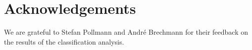 \section*{Acknowledgements}

We are grateful to Stefan Pollmann and Andr\'e Brechmann for their feedback on
the results of the classification analysis.

\newpage




